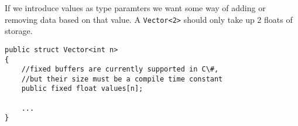 If we introduce values as type paramters we want some way of adding or removing data based on that value. A \texttt{Vector<2>} 
should only take up 2 floats of storage. 

\begin{lstlisting}[caption={A fixed size vector type}, keywordstyle={\color{blue}},language=sharpc]
public struct Vector<int n>
{
	//fixed buffers are currently supported in C\#,
	//but their size must be a compile time constant
	public fixed float values[n]; 
	
	...
}
\end{lstlisting}